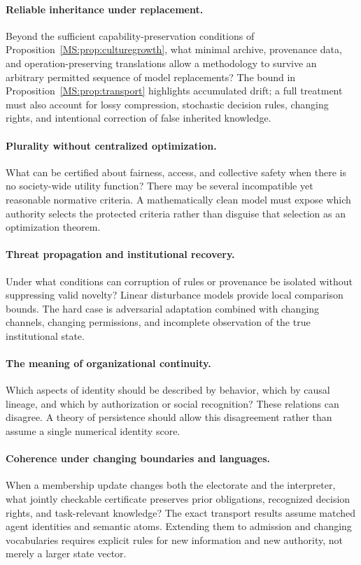\paragraph{Reliable inheritance under replacement.}
Beyond the sufficient capability-preservation conditions of Proposition~\ref{MS:prop:culturegrowth}, what minimal archive, provenance data, and operation-preserving translations allow a methodology to survive an arbitrary permitted sequence of model replacements? The bound in Proposition~\ref{MS:prop:transport} highlights accumulated drift; a full treatment must also account for lossy compression, stochastic decision rules, changing rights, and intentional correction of false inherited knowledge.

\paragraph{Plurality without centralized optimization.}
What can be certified about fairness, access, and collective safety when there is no society-wide utility function? There may be several incompatible yet reasonable normative criteria. A mathematically clean model must expose which authority selects the protected criteria rather than disguise that selection as an optimization theorem.

\paragraph{Threat propagation and institutional recovery.}
Under what conditions can corruption of rules or provenance be isolated without suppressing valid novelty? Linear disturbance models provide local comparison bounds. The hard case is adversarial adaptation combined with changing channels, changing permissions, and incomplete observation of the true institutional state.

\paragraph{The meaning of organizational continuity.}
Which aspects of identity should be described by behavior, which by causal lineage, and which by authorization or social recognition? These relations can disagree. A theory of persistence should allow this disagreement rather than assume a single numerical identity score.

\paragraph{Coherence under changing boundaries and languages.}
When a membership update changes both the electorate and the interpreter, what jointly checkable certificate preserves prior obligations, recognized decision rights, and task-relevant knowledge? The exact transport results assume matched agent identities and semantic atoms. Extending them to admission and changing vocabularies requires explicit rules for new information and new authority, not merely a larger state vector.

